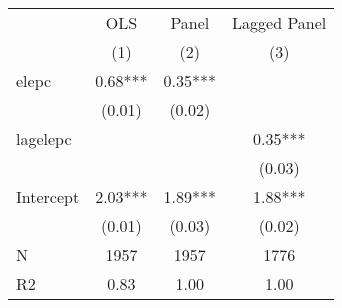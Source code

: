 \begin{table}
\caption{}
\begin{center}
\begin{tabular}{lccc}
\hline
          &   OLS   &  Panel  & Lagged Panel  \\
          &   (1)   &   (2)   &     (3)       \\
\midrule
\midrule
elepc     & 0.68*** & 0.35*** &               \\
          & (0.01)  & (0.02)  &               \\
lagelepc  &         &         & 0.35***       \\
          &         &         & (0.03)        \\
Intercept & 2.03*** & 1.89*** & 1.88***       \\
          & (0.01)  & (0.03)  & (0.02)        \\
N         & 1957    & 1957    & 1776          \\
R2        & 0.83    & 1.00    & 1.00          \\
\hline
\end{tabular}
\end{center}
\end{table}